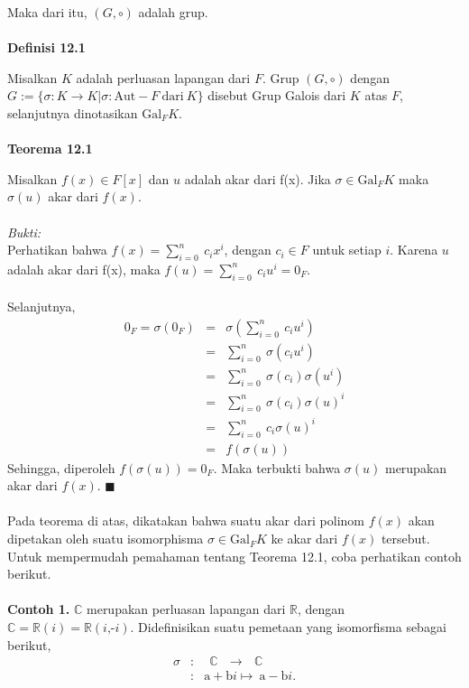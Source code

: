 	Maka dari itu, $(G, \circ)$ adalah grup.
\\ \\
	\textbf{Definisi 12.1}
\par 	Misalkan $K$ adalah perluasan lapangan dari $F$. Grup $(G, \circ)$ dengan $G:= \{\sigma:K\longrightarrow K | \sigma:\mathrm{Aut}-F~\mathrm{dari}~K\}$ disebut Grup Galois dari $K$ atas $F$, selanjutnya dinotasikan $\mathrm{Gal}_{F}K$.
\\ \\
	\textbf{Teorema 12.1}
\par 	Misalkan $f(x) \in F[x]$ dan $u$ adalah akar dari f(x). Jika $\sigma \in \mathrm{Gal}_{F}K$ maka $\sigma(u)$ akar dari $f(x).$
\\ \\
	\textit{Bukti:}
\\	Perhatikan bahwa $f(x)=\sum^{n}_{i=0} \ c_ix^i$, dengan $c_i\in F$ untuk setiap $i$. Karena $u$ adalah akar dari f(x), maka $f(u)=\sum^{n}_{i=0} \ c_iu^i=0_F.$
\\ \\ 	Selanjutnya, 
	$$\begin{array}{rcl}
	0_F = \sigma(0_F)&=& \sigma(\sum^{n}_{i=0} \ c_iu^i)\\
	&=& \sum^{n}_{i=0} \ \sigma(c_iu^i)\\
	&=& \sum^{n}_{i=0} \ \sigma(c_i)\sigma(u^i)\\
	&=& \sum^{n}_{i=0} \ \sigma(c_i)\sigma(u)^i\\
	&=& \sum^{n}_{i=0} \ c_i\sigma(u)^i\\
	&=& f(\sigma(u))
	\end{array}$$
	Sehingga, diperoleh $f(\sigma(u))=0_F$. Maka terbukti bahwa $\sigma(u)$ merupakan akar dari $f(x).$ $\blacksquare$
\\ \\ 	Pada teorema di atas, dikatakan bahwa suatu akar dari polinom $f(x)$ akan dipetakan oleh suatu isomorphisma $\sigma \in  \mathrm{Gal}_{F}K$ ke akar dari $f(x)$ tersebut. Untuk mempermudah pemahaman tentang Teorema 12.1, coba perhatikan contoh 		berikut.
\\ \\ 	\textbf{Contoh 1.}
	$\mathbb{C}$ merupakan perluasan lapangan dari $\mathbb{R}$, dengan $\mathbb{C}=\mathbb{R}(\textit{i})=\mathbb{R}(\textit{i,-i})$. Didefinisikan suatu pemetaan yang isomorfisma sebagai berikut,
	$$\begin{array}{rcl}
	\sigma &:& ~~\mathbb{C} ~~~\longrightarrow~~~ \mathbb{C}\\
	&:& \mathrm{a+b}i \mapsto ~\mathrm{a-b}i.
	\end{array}$$
